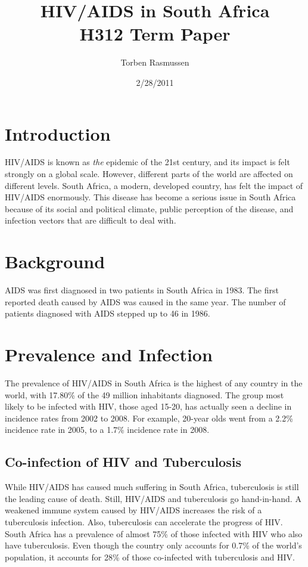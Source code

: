 \documentclass[12pt]{report}
\title{HIV/AIDS in South Africa \\ \normalsize{H312 Term Paper}}
\author{Torben Rasmussen}
\date{2/28/2011}
\begin{document}
\maketitle
\tableofcontents

\section{Introduction}
HIV/AIDS is known as \emph{the} epidemic of the 21st century, and its impact is felt strongly on a global scale.
However, different parts of the world are affected on different levels.  
South Africa, a modern, developed country, has felt the impact of HIV/AIDS enormously.
This disease has become a serious issue in South Africa because of its social and political climate, public perception of the disease, and infection vectors that are difficult to deal with. 

\section{Background}
AIDS was first diagnosed in two patients in South Africa in 1983.  The first reported death caused by AIDS was caused in the same year.
The number of patients diagnosed with AIDS stepped up to 46 in 1986.

\section{Prevalence and Infection}
The prevalence of HIV/AIDS in South Africa is the highest of any country in the world, with 17.80\% of the 49 million inhabitants diagnosed\cite{cia}.
The group most likely to be infected with HIV, those aged 15-20, has actually seen a decline in incidence rates from 2002 to 2008\cite{shisana}.
For example, 20-year olds went from a 2.2\% incidence rate in 2005, to a 1.7\% incidence rate in 2008.

\subsection{Co-infection of HIV and Tuberculosis}
While HIV/AIDS has caused much suffering in South Africa, tuberculosis is still the leading cause of death.
Still, HIV/AIDS and tuberculosis go hand-in-hand.
A weakened immune system caused by HIV/AIDS increases the risk of a tuberculosis infection.
Also, tuberculosis can accelerate the progress of HIV.
South Africa has a prevalence of almost 75\% of those infected with HIV who also have tuberculosis.
Even though the country only accounts for 0.7\% of the world's population, it accounts for 28\% of those co-infected with tuberculosis and HIV.
\end{document}
